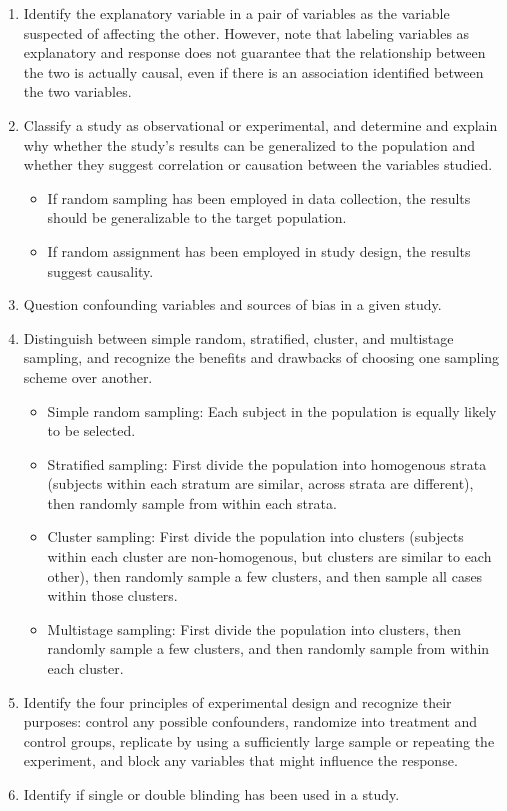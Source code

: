 \documentclass[11pt]{article}
\begin{document}
\begin{enumerate}[resume]
\renewcommand\labelenumi{\textcolor{light}{\textbf{LO \theenumi.}}}
\item Identify the explanatory variable in a pair of variables as the variable suspected of affecting the other. However, note that labeling variables as explanatory and response does not guarantee that the relationship between the two is actually causal, even if there is an association identified between the two variables. 
\item Classify a study as observational or experimental, and determine and explain why whether the study's results can be generalized to the population and whether they suggest correlation or causation between the variables studied.
\begin{itemize}
\renewcommand{\labelitemi}{{\textcolor{dark}{{\tiny $\blacksquare$}}}}
\item If random sampling has been employed in data collection, the results should be generalizable to the target population.
\item If random assignment has been employed in study design, the results suggest causality.
\end{itemize}
\item Question confounding variables and sources of bias in a given study.
\item Distinguish between simple random, stratified, cluster, and multistage sampling, and recognize the benefits and drawbacks of choosing one sampling scheme over another.
\begin{itemize}
\renewcommand{\labelitemi}{{\textcolor{dark}{{\tiny $\blacksquare$}}}}
\item Simple random sampling: Each subject in the population is equally likely to be selected.
\item Stratified sampling: First divide the population into homogenous strata (subjects within each stratum are similar, across strata are different), then randomly sample from within each strata.
\item Cluster sampling: First divide the population into clusters (subjects within each cluster are non-homogenous, but clusters are similar to each other), then randomly sample a few clusters, and then sample all cases within those clusters. 
\item Multistage sampling: First divide the population into clusters, then randomly sample a few clusters, and then randomly sample from within each cluster. 
\end{itemize}
\item Identify the four principles of experimental design and recognize their purposes: control any possible confounders, randomize into treatment and control groups, replicate by using a sufficiently large sample or repeating the experiment, and block any variables that might influence the response.
\item Identify if single or double blinding has been used in a study.
\end{enumerate}
\end{document}
